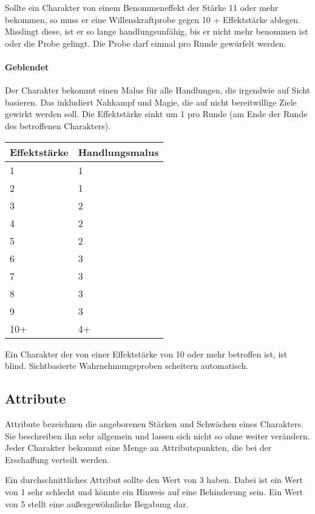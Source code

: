 \documentclass{article}
\begin{document}
Sollte ein Charakter von einem Benommeneffekt der Stärke 11 oder mehr bekommen, so muss er eine Willenskraftprobe gegen
10 + Effektstärke ablegen. Misslingt diese, ist er so lange handlungsunfähig, bis er nicht mehr benommen ist oder die Probe
gelingt. Die Probe darf einmal pro Runde gewürfelt werden. 

\paragraph{Geblendet}

Der Charakter bekommt einen Malus für alle Handlungen, die irgendwie auf Sicht basieren. Das inkludiert Nahkampf und
Magie, die auf nicht bereitwillige Ziele gewirkt werden soll. Die Effektstärke sinkt um 1 pro Runde (am Ende der Runde
des betroffenen Charakters).


\begin{small}
\begin{tabular}{|m{2cm}|m{3cm}|}
\hline
\textbf{Effektstärke}&\textbf{Handlungsmalus}\\
\hline
\hline
1&1\\
\hline
2&1\\
\hline
3&2\\
\hline
4&2\\
\hline
5&2\\
\hline
6&3\\
\hline
7&3\\
\hline
8&3\\
\hline
9&3\\
\hline
10+&4+\\
\hline
\end{tabular}
\end{small}

Ein Charakter der von einer Effektstärke von 10 oder mehr betroffen ist, ist blind. Sichtbasierte Wahrnehmungsproben
scheitern automatisch.

\begin{center}
\section{Attribute}
\end{center}

Attribute bezeichnen die angeborenen Stärken und Schwächen eines Charakters. Sie beschreiben ihn sehr allgemein und
lassen sich nicht so ohne weiter verändern. Jeder Charakter bekommt eine Menge an Attributspunkten, die bei der
Erschaffung verteilt werden.

Ein durchschnittliches Attribut sollte den Wert von 3 haben. Dabei ist ein Wert von 1 sehr schlecht und könnte
ein Hinweis auf eine Behinderung sein. Ein Wert von 5 stellt eine außergewöhnliche Begabung dar.
\end{document}
